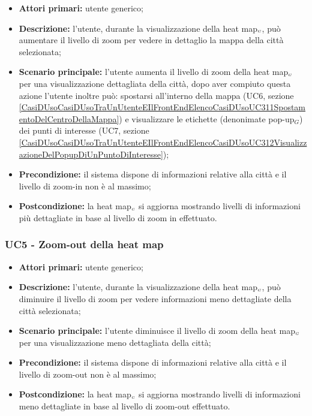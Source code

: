 \begin{itemize}
	\item \textbf{Attori primari:} utente generico;
	\item \textbf{Descrizione:} l’utente, durante la visualizzazione della heat map$_{\scaleto{G}{3pt}}$, può aumentare il livello di zoom per vedere in dettaglio la mappa della città selezionata;
	\item \textbf{Scenario principale:} l’utente aumenta il livello di zoom della heat map$_{\scaleto{G}{3pt}}$ per una visualizzazione dettagliata della città, dopo aver compiuto questa azione l'utente inoltre può: spostarsi all'interno della mappa (UC6, sezione \ref{CasiDUsoCasiDUsoTraUnUtenteEIlFrontEndElencoCasiDUsoUC311SpostamentoDelCentroDellaMappa}) e visualizzare le etichette (denonimate pop-up$_G$) dei punti di interesse (UC7, sezione \ref{CasiDUsoCasiDUsoTraUnUtenteEIlFrontEndElencoCasiDUsoUC312VisualizzazioneDelPopupDiUnPuntoDiInteresse});
	\item \textbf{Precondizione:} il sistema dispone di informazioni relative alla città e il livello di zoom-in non è al massimo;
	\item \textbf{Postcondizione:} la heat map$_{\scaleto{G}{3pt}}$ si aggiorna mostrando livelli di informazioni più dettagliate in base al livello di zoom in effettuato.
\end{itemize}

\subsubsection{UC5 - Zoom-out della heat map}\label{CasiDUsoCasiDUsoTraUnUtenteEIlFrontEndElencoCasiDUsoUC32ZoomOutDellaHeatMap}

\begin{itemize}
	\item \textbf{Attori primari:} utente generico;
	\item \textbf{Descrizione:} l’utente, durante la visualizzazione della heat map$_{\scaleto{G}{3pt}}$, può diminuire il livello di zoom per vedere informazioni meno dettagliate della città selezionata;
	\item \textbf{Scenario principale:} l’utente diminuisce il livello di zoom della heat map$_{\scaleto{G}{3pt}}$ per una visualizzazione meno dettagliata della città;
	\item \textbf{Precondizione:}  il sistema dispone di informazioni relative alla città e il livello di zoom-out non è al massimo;
	\item \textbf{Postcondizione:} la heat map$_{\scaleto{G}{3pt}}$ si aggiorna mostrando livelli di informazioni meno dettagliate in base al livello di zoom-out effettuato.
\end{itemize}

